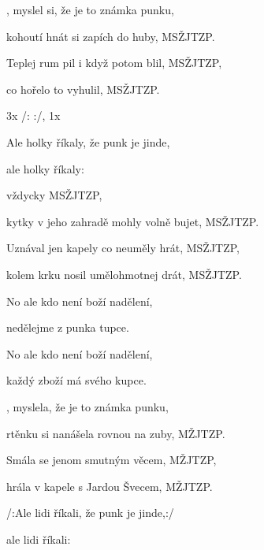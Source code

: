 

\zs
{}   , myslel si, že je to známka punku,

kohoutí hnát si zapích do huby, MSŽJTZP.

Teplej rum pil i když potom blil, MSŽJTZP,

co hořelo to vyhulil, MSŽJTZP.
\ks

\zr
3x /:    :/, 1x   

Ale holky říkaly,
že punk je jinde,

ale holky říkaly:
\kr

\zs
{}   vždycky  MSŽJTZP,

kytky v jeho zahradě mohly volně bujet, MSŽJTZP.

Uznával jen kapely co neuměly hrát, MSŽJTZP,

kolem krku nosil umělohmotnej drát, MSŽJTZP.
\ks

\zr  \kr

\zs
{}   

No ale kdo není boží nadělení,

nedělejme z punka tupce.

No ale kdo není boží nadělení,

každý zboží má svého kupce.
\ks

\zs
{}   , myslela, že je to známka punku,

rtěnku si nanášela rovnou na zuby, MŽJTZP.

Smála se jenom smutným věcem, MŽJTZP,

hrála v kapele s Jardou Švecem, MŽJTZP.
\ks

\zr
/:Ale lidi říkali,
že punk je jinde,:/

ale lidi říkali:
\kr

\kp






















